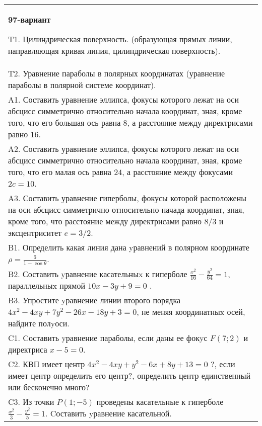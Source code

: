 \documentclass{article}
\begin{document}
\begin{tabular}{m{17cm}}
\textbf{97-вариант}
\newline

T1. Цилиндрическая поверхность. (образующая прямых линии, направляющая кривая линия, цилиндрическая поверхность).\\

T2. Уравнение параболы в полярных координатах (уравнение параболы в полярной системе координат).\\

A1. Составить уравнение эллипса, фокусы которого лежат на оси абсцисс симметрично относительно начала координат, зная, кроме того, что его большая ось равна $8$, а расстояние между директрисами равно $16$.\\

A2. Составить уравнение эллипса, фокусы которого лежат на оси абсцисс симметрично относительно начала координат, зная, кроме того, что его малая ось равна $24$, а расстояние между фокусами $2c=10$.\\

A3. Составить уравнение гиперболы, фокусы которой расположены на оси абсцисс симметрично относительно начада координат, зная, кроме того, что расстояние между директрисами равно $8/3$ и эксцентриситет $e=3/2$.\\

B1. Определить какая линия дана yравнений в полярном координате $\rho = \frac{6}{1 - \cos\theta}$.  \\

B2. Составить yравнение касательныx к гиперболе $\frac{x^{2}}{16} - \frac{y^{2}}{64} = 1$, параллельныx прямой $10x - 3y + 9 = 0$ .  \\

B3. Упростите yравнение линии второго порядка $4x^{2} - 4xy + 7y^{2} - 26x - 18y + 3 = 0$, не меняя координатныx осей, найдите полyоси.\\

C1. Cоставить yравнение параболы, если даны ее фокyс $F(7;2)$ и директриса $x-5=0$.  \\

C2. КВП имеет центр $4x^{2}-4xy+y^{2}-6x+8y+13=0$ ?, если имеет центр определить его центр?, определить центр единственный или бесконечно много?  \\

C3. Из точки $P(1;-5)$ проведены касательные к гиперболе $\frac{x^{2}}{3}-\frac{y^{2}}{5}=1$. Cоставить yравнение касательной.\\

\end{tabular}
\vspace{1cm}
\end{document}
